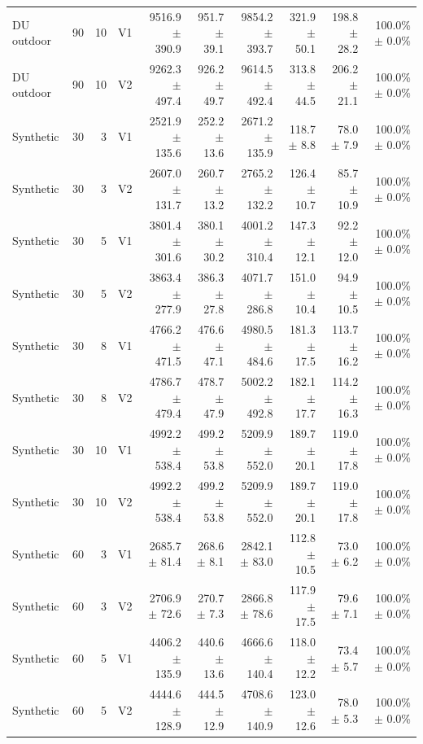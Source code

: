 \documentclass[10pt,a4paper]{article}
\begin{document}
\begin{landscape}
\begin{longtable}{@{}lrrlrrrrrr@{}}
DU outdoor & 90 & 10 & V1 & 9516.9 $\pm$ 390.9 & 951.7 $\pm$ 39.1 & 9854.2 $\pm$ 393.7 & 321.9 $\pm$ 50.1 & 198.8 $\pm$ 28.2 & 100.0\% $\pm$ 0.0\% \\
DU outdoor & 90 & 10 & V2 & 9262.3 $\pm$ 497.4 & 926.2 $\pm$ 49.7 & 9614.5 $\pm$ 492.4 & 313.8 $\pm$ 44.5 & 206.2 $\pm$ 21.1 & 100.0\% $\pm$ 0.0\% \\
Synthetic & 30 & 3 & V1 & 2521.9 $\pm$ 135.6 & 252.2 $\pm$ 13.6 & 2671.2 $\pm$ 135.9 & 118.7 $\pm$ 8.8 & 78.0 $\pm$ 7.9 & 100.0\% $\pm$ 0.0\% \\
Synthetic & 30 & 3 & V2 & 2607.0 $\pm$ 131.7 & 260.7 $\pm$ 13.2 & 2765.2 $\pm$ 132.2 & 126.4 $\pm$ 10.7 & 85.7 $\pm$ 10.9 & 100.0\% $\pm$ 0.0\% \\
Synthetic & 30 & 5 & V1 & 3801.4 $\pm$ 301.6 & 380.1 $\pm$ 30.2 & 4001.2 $\pm$ 310.4 & 147.3 $\pm$ 12.1 & 92.2 $\pm$ 12.0 & 100.0\% $\pm$ 0.0\% \\
Synthetic & 30 & 5 & V2 & 3863.4 $\pm$ 277.9 & 386.3 $\pm$ 27.8 & 4071.7 $\pm$ 286.8 & 151.0 $\pm$ 10.4 & 94.9 $\pm$ 10.5 & 100.0\% $\pm$ 0.0\% \\
Synthetic & 30 & 8 & V1 & 4766.2 $\pm$ 471.5 & 476.6 $\pm$ 47.1 & 4980.5 $\pm$ 484.6 & 181.3 $\pm$ 17.5 & 113.7 $\pm$ 16.2 & 100.0\% $\pm$ 0.0\% \\
Synthetic & 30 & 8 & V2 & 4786.7 $\pm$ 479.4 & 478.7 $\pm$ 47.9 & 5002.2 $\pm$ 492.8 & 182.1 $\pm$ 17.7 & 114.2 $\pm$ 16.3 & 100.0\% $\pm$ 0.0\% \\
Synthetic & 30 & 10 & V1 & 4992.2 $\pm$ 538.4 & 499.2 $\pm$ 53.8 & 5209.9 $\pm$ 552.0 & 189.7 $\pm$ 20.1 & 119.0 $\pm$ 17.8 & 100.0\% $\pm$ 0.0\% \\
Synthetic & 30 & 10 & V2 & 4992.2 $\pm$ 538.4 & 499.2 $\pm$ 53.8 & 5209.9 $\pm$ 552.0 & 189.7 $\pm$ 20.1 & 119.0 $\pm$ 17.8 & 100.0\% $\pm$ 0.0\% \\
Synthetic & 60 & 3 & V1 & 2685.7 $\pm$ 81.4 & 268.6 $\pm$ 8.1 & 2842.1 $\pm$ 83.0 & 112.8 $\pm$ 10.5 & 73.0 $\pm$ 6.2 & 100.0\% $\pm$ 0.0\% \\
Synthetic & 60 & 3 & V2 & 2706.9 $\pm$ 72.6 & 270.7 $\pm$ 7.3 & 2866.8 $\pm$ 78.6 & 117.9 $\pm$ 17.5 & 79.6 $\pm$ 7.1 & 100.0\% $\pm$ 0.0\% \\
Synthetic & 60 & 5 & V1 & 4406.2 $\pm$ 135.9 & 440.6 $\pm$ 13.6 & 4666.6 $\pm$ 140.4 & 118.0 $\pm$ 12.2 & 73.4 $\pm$ 5.7 & 100.0\% $\pm$ 0.0\% \\
Synthetic & 60 & 5 & V2 & 4444.6 $\pm$ 128.9 & 444.5 $\pm$ 12.9 & 4708.6 $\pm$ 140.9 & 123.0 $\pm$ 12.6 & 78.0 $\pm$ 5.3 & 100.0\% $\pm$ 0.0\% \\

\end{longtable}
\end{landscape}
\end{document}
